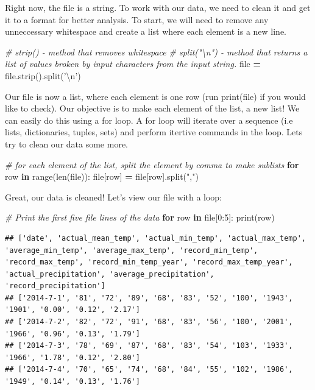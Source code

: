 \documentclass[]{book}
\newenvironment{Shaded}{\begin{snugshade}}{\end{snugshade}}
\newcommand{\KeywordTok}[1]{\textcolor[rgb]{0.13,0.29,0.53}{\textbf{#1}}}
\newcommand{\DecValTok}[1]{\textcolor[rgb]{0.00,0.00,0.81}{#1}}
\newcommand{\CharTok}[1]{\textcolor[rgb]{0.31,0.60,0.02}{#1}}
\newcommand{\StringTok}[1]{\textcolor[rgb]{0.31,0.60,0.02}{#1}}
\newcommand{\CommentTok}[1]{\textcolor[rgb]{0.56,0.35,0.01}{\textit{#1}}}
\newcommand{\ControlFlowTok}[1]{\textcolor[rgb]{0.13,0.29,0.53}{\textbf{#1}}}
\newcommand{\OperatorTok}[1]{\textcolor[rgb]{0.81,0.36,0.00}{\textbf{#1}}}
\newcommand{\BuiltInTok}[1]{#1}
\newcommand{\NormalTok}[1]{#1}
\begin{document}
Right now, the file is a string. To work with our data, we need to clean
it and get it to a format for better analysis. To start, we will need to
remove any unneccessary whitespace and create a list where each element
is a new line.

\begin{Shaded}
\begin{Highlighting}[]
\CommentTok{# strip() - method that removes whitespace }
\CommentTok{# split("\textbackslash{}n") - method that returns a list of values broken by input characters from the input string.}
\BuiltInTok{file} \OperatorTok{=} \BuiltInTok{file}\NormalTok{.strip().split(}\StringTok{'}\CharTok{\textbackslash{}n}\StringTok{'}\NormalTok{)}
\end{Highlighting}
\end{Shaded}

Our file is now a list, where each element is one row (run print(file)
if you would like to check). Our objective is to make each element of
the list, a new list! We can easily do this using a for loop. A for loop
will iterate over a sequence (i.e lists, dictionaries, tuples, sets) and
perform itertive commands in the loop. Lets try to clean our data some
more.

\begin{Shaded}
\begin{Highlighting}[]
\CommentTok{# for each element of the list, split the element by comma to make sublists}
\ControlFlowTok{for}\NormalTok{ row }\KeywordTok{in} \BuiltInTok{range}\NormalTok{(}\BuiltInTok{len}\NormalTok{(}\BuiltInTok{file}\NormalTok{)):}
    \BuiltInTok{file}\NormalTok{[row] }\OperatorTok{=} \BuiltInTok{file}\NormalTok{[row].split(}\StringTok{","}\NormalTok{)}
\end{Highlighting}
\end{Shaded}

Great, our data is cleaned! Let's view our file with a loop:

\begin{Shaded}
\begin{Highlighting}[]
\CommentTok{# Print the first five file lines of the data }
\ControlFlowTok{for}\NormalTok{ row }\KeywordTok{in} \BuiltInTok{file}\NormalTok{[}\DecValTok{0}\NormalTok{:}\DecValTok{5}\NormalTok{]: }
  \BuiltInTok{print}\NormalTok{(row)}
\end{Highlighting}
\end{Shaded}

\begin{verbatim}
## ['date', 'actual_mean_temp', 'actual_min_temp', 'actual_max_temp', 'average_min_temp', 'average_max_temp', 'record_min_temp', 'record_max_temp', 'record_min_temp_year', 'record_max_temp_year', 'actual_precipitation', 'average_precipitation', 'record_precipitation']
## ['2014-7-1', '81', '72', '89', '68', '83', '52', '100', '1943', '1901', '0.00', '0.12', '2.17']
## ['2014-7-2', '82', '72', '91', '68', '83', '56', '100', '2001', '1966', '0.96', '0.13', '1.79']
## ['2014-7-3', '78', '69', '87', '68', '83', '54', '103', '1933', '1966', '1.78', '0.12', '2.80']
## ['2014-7-4', '70', '65', '74', '68', '84', '55', '102', '1986', '1949', '0.14', '0.13', '1.76']
\end{verbatim}
\end{document}
